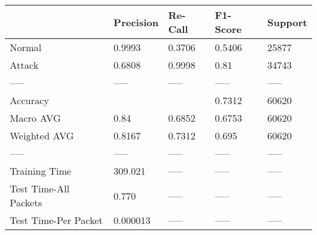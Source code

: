 \begin{tabular}{lllll}
\toprule
{} & Precision & Re-Call & F1-Score & Support \\
\midrule
Normal                &    0.9993 &  0.3706 &   0.5406 &   25877 \\
Attack                &    0.6808 &  0.9998 &     0.81 &   34743 \\
-----                 &     ----- &   ----- &    ----- &   ----- \\
Accuracy              &           &         &   0.7312 &   60620 \\
Macro AVG             &      0.84 &  0.6852 &   0.6753 &   60620 \\
Weighted AVG          &    0.8167 &  0.7312 &    0.695 &   60620 \\
-----                 &     ----- &   ----- &    ----- &   ----- \\
Training Time         &   309.021 &   ----- &    ----- &   ----- \\
Test Time-All Packets &     0.770 &   ----- &    ----- &   ----- \\
Test Time-Per Packet  &  0.000013 &   ----- &    ----- &   ----- \\
\bottomrule
\end{tabular}
